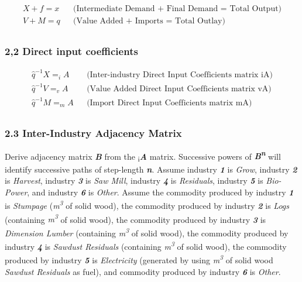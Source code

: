 \documentclass[
  letterpaper,
  DIV=11,
  numbers=noendperiod]{scrartcl}
\begin{document}
\[
\begin{align}
    X + f = x && \text{(Intermediate Demand + Final Demand = Total Output)}\\
    V + M = q && \text{(Value Added + Imports = Total Outlay)}\\
\end{align}
\]

\hypertarget{direct-input-coefficients}{%
\subsubsection{2,2 Direct input
coefficients}\label{direct-input-coefficients}}

\[
\begin{align}
    \hat{q}^{-1}X = _{i}A && \text{(Inter-industry Direct Input Coefficients matrix iA)}\\
    \hat{q}^{-1}V = _{v}A && \text{(Value Added Direct Input Coefficients matrix vA)}\\
    \hat{q}^{-1}M = _{m}A && \text{(Import Direct Input Coefficients matrix mA)}\\
\end{align}
\]

\hypertarget{inter-industry-adjacency-matrix}{%
\subsubsection{2.3 Inter-Industry Adjacency
Matrix}\label{inter-industry-adjacency-matrix}}

Derive adjacency matrix \textbf{\emph{B}} from the
\textsubscript{i}\textbf{\emph{A}} matrix. Successive powers of
\textbf{\emph{B\textsuperscript{n}}} will identify successive paths of
step-length \textbf{\emph{n}}. Assume industry \textbf{\emph{1}} is
\emph{Grow}, industry \textbf{\emph{2}} is \emph{Harvest}, industry
\textbf{\emph{3}} is \emph{Saw Mill}, industry \textbf{\emph{4}} is
\emph{Residuals}, industry \textbf{\emph{5}} is \emph{Bio-Power}, and
industry \textbf{\emph{6}} is \emph{Other}. Assume the commodity
produced by industry \textbf{\emph{1}} is \emph{Stumpage}
(\emph{m\textsuperscript{3}} of solid wood), the commodity produced by
industry \textbf{\emph{2}} is \emph{Logs} (containing
\emph{m\textsuperscript{3}} of solid wood), the commodity produced by
industry \textbf{\emph{3}} is \emph{Dimension Lumber} (containing
\emph{m\textsuperscript{3}} of solid wood), the commodity produced by
industry \textbf{\emph{4}} is \emph{Sawdust Residuals} (containing
\emph{m\textsuperscript{3}} of solid wood), the commodity produced by
industry \textbf{\emph{5}} is \emph{Electricity} (generated by using
\emph{m\textsuperscript{3}} of solid wood \emph{Sawdust Residuals} as
fuel), and commodity produced by industry \textbf{\emph{6}} is
\emph{Other}.
\end{document}
